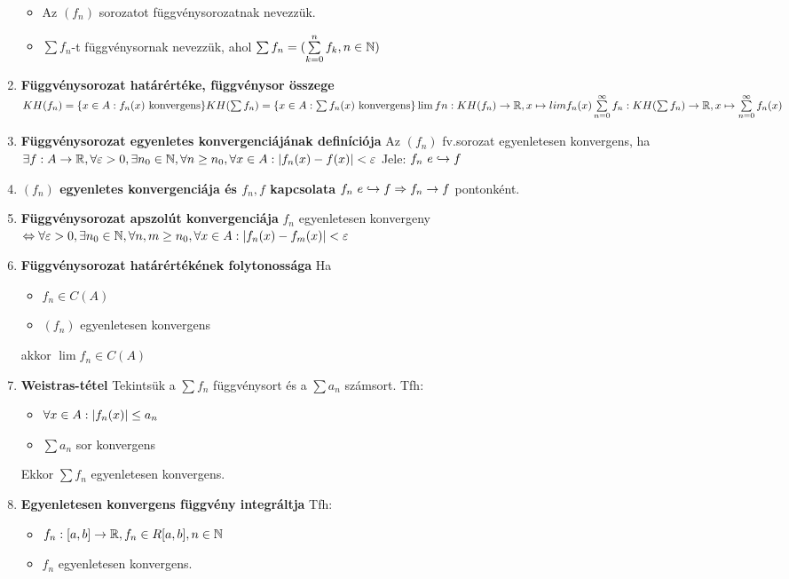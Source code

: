 \documentclass{article}
\begin{document}
\begin{enumerate}
\begin{itemize}
		\item Az $(f_n)$ sorozatot függvénysorozatnak nevezzük.
		\item$\sum f_n$-t függvénysornak nevezzük, ahol $\sum f_n=
		(\sum\limits_{k=0}^n f_k, n\in\mathbb{N})$
	\end{itemize}
	\item\textbf{Függvénysorozat határértéke, függvénysor összege}\br
	$KH(f_n)=\{x\in A:f_n(x)\text{ konvergens}\}\br
	KH(\sum f_n)=\{x\in A:\sum f_n(x)\text{ konvergens}\}\br
	\lim fn:KH(f_n)\rightarrow\R,x\mapsto lim f_n(x)\br
	\sum\limits_{n=0}^\infty f_n:KH(\sum f_n)\rightarrow\R,x\mapsto
	\sum\limits_{n=0}^\infty f_n(x)$
	\item\textbf{Függvénysorozat egyenletes konvergenciájának definíciója}\br
	Az $(f_n)$ fv.sorozat egyenletesen konvergens, ha\br$\exists f:A\rightarrow
	\mathbb{R},\forall\varepsilon>0,\exists n_0\in\mathbb{N},\forall n\geq n_0,\forall x\in A:
	\abs{f_n(x) - f(x)}< \varepsilon$\br
	Jele: $f_n \text{ }e\hookrightarrow f$
	\item\textbf{$(f_n)$ egyenletes konvergenciája és $f_n,f$ kapcsolata}\br
	$f_n\text{ }e\hookrightarrow f
	\Rightarrow f_n\rightarrow f$ pontonként.
	\item\textbf{Függvénysorozat apszolút konvergenciája}\br
	$f_n$ egyenletesen konvergeny $\Leftrightarrow\forall\varepsilon>0,
	\exists n_0\in\mathbb{N},\forall n,m\geq n_0,\forall x\in A:\abs{f_n(x) - f_m(x)}< \varepsilon$
	\item\textbf{Függvénysorozat határértékének folytonossága}\br
	Ha \begin{itemize}
		\item $f_n\in C(A)$
		\item $(f_n)$ egyenletesen konvergens
	\end{itemize}
	akkor $\lim f_n\in C(A)$
	\item\textbf{Weistras-tétel}\br
	Tekintsük a $\sum f_n$ függvénysort és a $\sum a_n$ számsort. Tfh:
	\begin{itemize}
		\item $\forall x\in A:\abs{f_n(x)}\leq a_n$
		\item $\sum a_n$ sor konvergens
	\end{itemize}
	Ekkor $\sum f_n$ egyenletesen konvergens.
	\item\textbf{Egyenletesen konvergens függvény integráltja}\br
	Tfh: \begin{itemize}
		\item $f_n:[a,b]\rightarrow\mathbb{R},f_n\in R[a,b],n\in\mathbb{N}$
		\item $f_n$ egyenletesen konvergens.

\end{itemize}
\end{enumerate}
\end{document}
